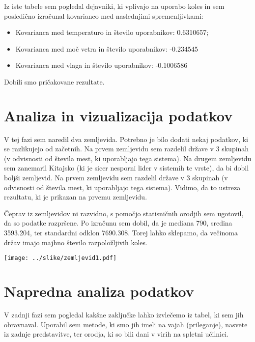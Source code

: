 \documentclass[11pt,a4paper]{article}
\begin{document}
Iz iste tabele sem pogledal dejavniki, ki vplivajo na uporabo koles in sem posledično izračunal kovarianco med naslednjimi spremenljivkami:
\begin{itemize}
\item{Kovarianca med temperaturo in število uporabnikov: 0.6310657;}
\item{Kovarianca med moč vetra in število uporabnikov: -0.234545}
\item{Kovarianca med vlaga in število uporabnikov: -0.1006586}
\end{itemize}
Dobili smo pričakovane rezultate. 






\section{Analiza in vizualizacija podatkov}

V tej fazi sem naredil dva zemljevida. Potrebno je bilo dodati nekaj podatkov, ki se razlikujejo od začetnih. Na prvem zemljevidu sem razdelil države v 3 skupinah (v odvisnosti od števila mest, ki uporabljajo tega sistema). Na drugem zemljevidu sem zanemaril Kitajsko (ki je sicer nesporni lider v sistemih te vrste), da bi dobil boljši zemljevid. Na prvem zemljevidu sem razdelil države v 3 skupinah (v odvisnosti od števila mest, ki uporabljajo tega sistema). Vidimo, da to ustreza rezultatu, ki je prikazan na prvemu zemljevidu.

Čeprav iz zemljevidov ni razvidno, s pomočjo statisničnih orodjih sem ugotovil, da so podatke razpršene. Po izračunu sem dobil, da je mediana 790, sredina 3593.204, ter standardni odklon 7690.308. Torej lahko sklepamo, da večinoma držav imajo majhno število razpoložljivih koles. 


\newpage
\texttt{[image: ../slike/zemljevid1.pdf]}

\section{Napredna analiza podatkov}

  V zadnji fazi sem pogledal kakšne zaključke lahko izvlečemo iz tabel, ki sem jih obravnaval. Uporabil sem metode, ki smo jih imeli na vajah (prileganje), nasvete iz zadnje predstavitve, ter orodja, ki so bili dani v virih na spletni učilnici.
\end{document}
